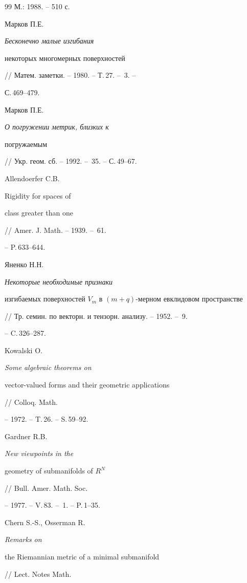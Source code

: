 \begin{thebibliography}{99}
М.: 1988. -- 510 с.





 Марков П.Е. {\em Бесконечно малые изгибания


некоторых многомерных поверхностей}


// Матем. заметки. -- 1980. -- Т.\,27. -- \No\,3. -- 


С.\,469--479.





 Марков П.Е. {\em О погружении метрик, близких к


погружаемым} // Укр. геом. сб. -- 1992. -- \No\,35. -- С.\,49--67.





 Allendoerfer C.B. {Rigidity for spaces of


class greater than one} // Amer. J. Math. -- 1939. -- \No\,61.


-- P.\,633--644.





 Яненко Н.Н. {\em Некоторые необходимые признаки


изгибаемых поверхностей $V_m$ в $(m+q)$-мерном евклидовом пространстве}


// Тр. семин. по векторн. и тензорн. анализу. -- 1952. -- \No\,9.


-- C.\,326--287.





 Kowalski O. {\em Some algebraic theorems on


vector-valued forms and their geometric applications} // Colloq. Math.


-- 1972. -- T.\,26. -- S.\,59--92.





 Gardner R.B. {\em New viewpoints in the


geometry of submanifolds of $R^N$} // Bull. Amer. Math. Soc.


-- 1977. -- V.\,83. -- \No\,1. -- P.\,1--35.





 Chern S.-S., Osserman R. {\em Remarks on


the Riemannian metric of a minimal submanifold} // Lect. Notes Math.



\end{thebibliography}
